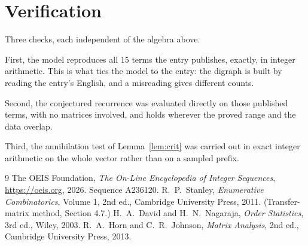 \documentclass[11pt,a4paper]{article}
\theoremstyle{plain}
\theoremstyle{definition}
\begin{document}
\section{Verification}

Three checks, each independent of the algebra above.

First, the model reproduces all $15$ terms the entry publishes, exactly, in integer
arithmetic. This is what ties the model to the entry: the digraph is built by reading the
entry's English, and a misreading gives different counts.

Second, the conjectured recurrence was evaluated directly on those published terms, with no
matrices involved, and holds wherever the proved range and the data overlap.

Third, the annihilation test of Lemma~\ref{lem:crit} was carried out in exact integer
arithmetic on the whole vector rather than on a sampled prefix.

\begin{thebibliography}{9}
 The OEIS Foundation, \emph{The On-Line Encyclopedia of Integer
Sequences}, \url{https://oeis.org}, 2026. Sequence A236120.
 R.~P.~Stanley, \emph{Enumerative Combinatorics}, Volume 1, 2nd ed.,
Cambridge University Press, 2011. (Transfer-matrix method, Section 4.7.)
 H.~A.~David and H.~N.~Nagaraja, \emph{Order Statistics}, 3rd ed., Wiley,
2003.
 R.~A.~Horn and C.~R.~Johnson, \emph{Matrix Analysis}, 2nd ed., Cambridge
University Press, 2013.
\end{thebibliography}
\end{document}
